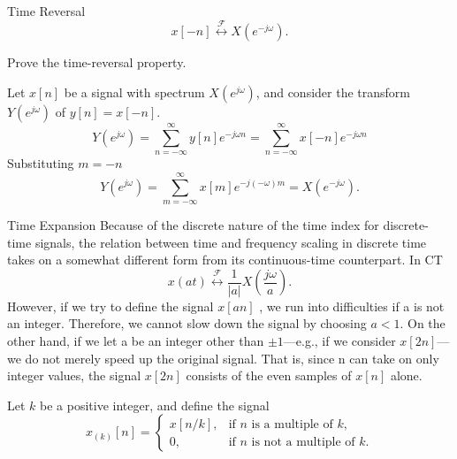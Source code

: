 \begin{frame}{Time Reversal}
    \begin{equation*}
        x[-n] \overset{\mathcal{F}}{\leftrightarrow} X(e^{-j\omega}).
    \end{equation*}
    \begin{example}
        Prove the time-reversal property.
    \end{example}
    \pause
    {
        Let $x[n]$ be a signal with spectrum $X(e^{j\omega})$, and consider the transform $Y(e^{j\omega})$ of $y[n] = x[-n]$.
        \begin{equation*}
            Y(e^{j\omega}) = \sum_{n=-\infty}^{\infty}y[n] e^{-j\omega n} = \sum_{n=-\infty}^{\infty}x[-n] e^{-j\omega n}
        \end{equation*}
        Substituting $m=-n$
        \begin{equation*}
            Y(e^{j\omega}) = \sum_{m=-\infty}^{\infty}x[m] e^{-j(-\omega)m} = X(e^{-j\omega}).
        \end{equation*}
    }
\end{frame}

\begin{frame}{Time Expansion}
    Because of the discrete nature of the time index for discrete-time signals, the relation between time and frequency scaling in discrete time takes on a somewhat different form from its continuous-time counterpart. In CT
    \begin{equation*}
        x(at)  \overset{\mathcal{F}}{\leftrightarrow}  \frac{1}{|a|} X\left(\frac{j\omega}{a}\right).
    \end{equation*}
    However, if we try to define the signal $x[an]$ , we run into difficulties if a is not an integer. Therefore, we cannot slow down the signal by choosing $a < 1$. On the other hand, if we let a be an integer other than $\pm1$---e.g., if we consider $x[2n]$---we do not merely
    speed up the original signal. That is, since n can take on only integer values, the signal $x[2n]$ consists of the even samples of $x[n]$ alone.

    Let $k$ be a positive integer, and define the signal
    \begin{equation*}
        x_{(k)}[n] = \begin{cases}x[n/k], & \text{if $n$ is a multiple of $k$},\\0, & \text{if $n$ is not a multiple of $k$}. \end{cases}
    \end{equation*}
\end{frame}

